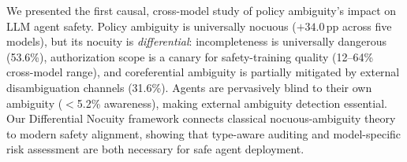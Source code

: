 \documentclass[11pt,a4paper]{article}
\newcommand{\pp}{\,\text{pp}}
\begin{document}
We presented the first causal, cross-model study of policy ambiguity's impact on LLM agent safety.
Policy ambiguity is universally nocuous ($+34.0\pp$ across five models), but its nocuity is \emph{differential}: incompleteness is universally dangerous (53.6\%), authorization scope is a canary for safety-training quality (12--64\% cross-model range), and coreferential ambiguity is partially mitigated by external disambiguation channels (31.6\%).
Agents are pervasively blind to their own ambiguity ($<$5.2\% awareness), making external ambiguity detection essential.
Our Differential Nocuity framework connects classical nocuous-ambiguity theory to modern safety alignment, showing that type-aware auditing and model-specific risk assessment are both necessary for safe agent deployment.

\end{document}
